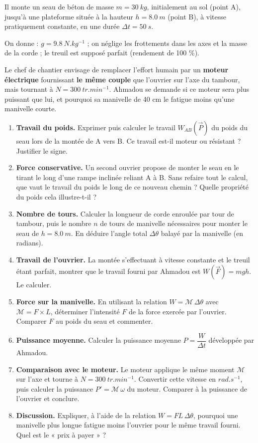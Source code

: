 \documentclass[11pt]{article}
\newcounter{popsec}
\newcounter{popsub}
\newcommand{\courssub}[1]{%
  \stepcounter{popsub}%
  \par\vspace{9pt}\noindent{\popxbold\fontsize{11.5}{13}\selectfont\color{popink}{\color{poporange}\thepopsec.\thepopsub}\hspace{6pt}#1}\par\nopagebreak\vspace{4pt}
}
\begin{document}
Il monte un seau de béton de masse $m = \SI{30}{kg}$, initialement au sol (point A), jusqu'à une plateforme située à la hauteur $h = \SI{8,0}{m}$ (point B), à vitesse pratiquement constante, en une durée $\Delta t = \SI{50}{s}$.

On donne : $g = \SI{9,8}{N.kg^{-1}}$ ; on néglige les frottements dans les axes et la masse de la corde ; le treuil est supposé parfait (rendement de 100 \%).

Le chef de chantier envisage de remplacer l'effort humain par un \textbf{moteur électrique} fournissant \textbf{le même couple} que l'ouvrier sur l'axe du tambour, mais tournant à $N = \SI{300}{tr.min^{-1}}$. Ahmadou se demande si ce moteur sera plus puissant que lui, et pourquoi sa manivelle de 40 cm le fatigue moins qu'une manivelle courte.

\courssub{Consignes}

\begin{enumerate}
\item \textbf{Travail du poids.} Exprimer puis calculer le travail $W_{AB}(\vec{P})$ du poids du seau lors de la montée de A vers B. Ce travail est-il moteur ou résistant ? Justifier le signe.
\item \textbf{Force conservative.} Un second ouvrier propose de monter le seau en le tirant le long d'une rampe inclinée reliant A à B. Sans refaire tout le calcul, que vaut le travail du poids le long de ce nouveau chemin ? Quelle propriété du poids cela illustre-t-il ?
\item \textbf{Nombre de tours.} Calculer la longueur de corde enroulée par tour de tambour, puis le nombre $n$ de tours de manivelle nécessaires pour monter le seau de $h = \SI{8,0}{m}$. En déduire l'angle total $\Delta\theta$ balayé par la manivelle (en radians).
\item \textbf{Travail de l'ouvrier.} La montée s'effectuant à vitesse constante et le treuil étant parfait, montrer que le travail fourni par Ahmadou est $W(\vec{F}) = mgh$. Le calculer.
\item \textbf{Force sur la manivelle.} En utilisant la relation $W = \mathcal{M}\,\Delta\theta$ avec $\mathcal{M} = F \times L$, déterminer l'intensité $F$ de la force exercée par l'ouvrier. Comparer $F$ au poids du seau et commenter.
\item \textbf{Puissance moyenne.} Calculer la puissance moyenne $P = \dfrac{W}{\Delta t}$ développée par Ahmadou.
\item \textbf{Comparaison avec le moteur.} Le moteur applique le même moment $\mathcal{M}$ sur l'axe et tourne à $N = \SI{300}{tr.min^{-1}}$. Convertir cette vitesse en $\si{rad.s^{-1}}$, puis calculer la puissance $P' = \mathcal{M}\,\omega$ du moteur. Comparer à la puissance de l'ouvrier et conclure.
\item \textbf{Discussion.} Expliquer, à l'aide de la relation $W = F L\,\Delta\theta$, pourquoi une manivelle plus longue fatigue moins l'ouvrier pour le même travail fourni. Quel est le « prix à payer » ?
\end{enumerate}
\end{document}
